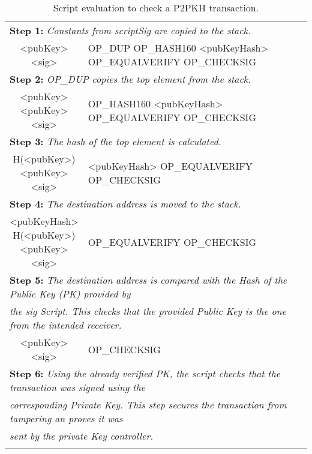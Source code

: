 \begin{table}[tbp]
  \small
    \caption{Script evaluation to check a P2PKH transaction.}
    \label{tab:p2pkh_exec}
    \begin{tabularx}{\textwidth}{| c | X |}
    \hline
	    \thead{Stack} & \thead{Script} \\
	\hline
      \multicolumn{2}{|l|}{\textbf{Step 1: }\textit{%
          Constants from scriptSig are copied to the stack.}} \\
    \hline
	  \makecell{<pubKey>\\<sig>} & OP\_DUP \footnotesize{%
          OP\_HASH160 <pubKeyHash> OP\_EQUALVERIFY OP\_CHECKSIG} \\
    \hline
	  \multicolumn{2}{|l|}{\textbf{Step 2: }\textit{%
	      OP\_DUP copies the top element from the stack.}} \\
    \hline
      \makecell{<pubKey> \\ <pubKey> \\ <sig>} & OP\_HASH160 \footnotesize{%
          <pubKeyHash> OP\_EQUALVERIFY OP\_CHECKSIG} \\
	\hline
      \multicolumn{2}{|l|}{\textbf{Step 3: }\textit{%
          The hash of the top element is calculated.}} \\
    \hline
	  \makecell{H(<pubKey>) \\ <pubKey> \\ <sig>} & <pubKeyHash> \footnotesize{%
          OP\_EQUALVERIFY OP\_CHECKSIG} \\
    \hline
	  \multicolumn{2}{|l|}{\textbf{Step 4: }\textit{%
	      The destination address is moved to the stack.}} \\
	\hline
	  \makecell{<pubKeyHash> \\ H(<pubKey>) \\ <pubKey> \\ <sig>} &%
	      OP\_EQUALVERIFY \footnotesize{OP\_CHECKSIG} \\
	\hline
	  \multicolumn{2}{|l|}{\textbf{Step 5: }\textit{%
	      The destination address is compared with the Hash of the %
          Public Key (PK) provided by}} \\
	  \multicolumn{2}{|l|}{\textit{the sig Script. This checks that the provided %
	      Public Key is the one from the intended receiver.}} \\
	\hline
	  \makecell{<pubKey> \\ <sig>} & OP\_CHECKSIG \\
	\hline
	  \multicolumn{2}{|l|}{\textbf{Step 6: }\textit{%
	      Using the already verified PK, the script checks that the transaction was %
          signed using the}} \\
	  \multicolumn{2}{|l|}{\textit{corresponding Private Key. This step %
	      secures the transaction from tampering an proves it was}} \\
	  \multicolumn{2}{|l|}{\textit{sent by the private Key controller.}} \\
	\hline
	  \makecell{True} & \\
	\hline
    \end{tabularx}
\end{table}

